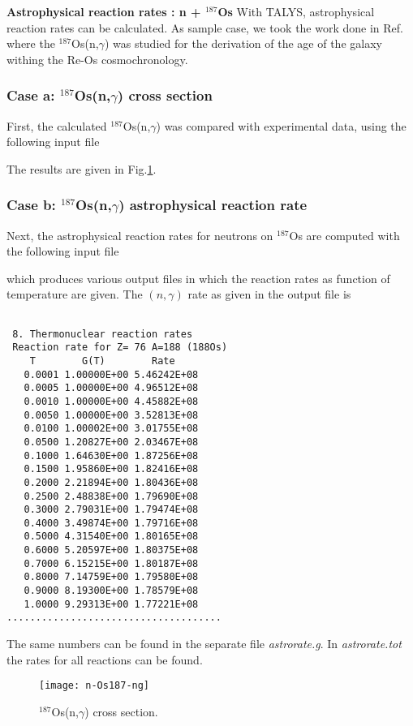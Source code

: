 \begin{samplecase}
{\bf Astrophysical reaction rates : n + ${}^{187}$Os}\newline
With TALYS, astrophysical reaction rates can be calculated.
As sample case, we took the work done in
Ref.\cite{Segawa2007} where the ${}^{187}$Os(n,$\gamma$) was studied for
the derivation of the age of the galaxy withing the
Re-Os cosmochronology. 
\subsubsection{Case a: ${}^{187}$Os(n,$\gamma$) cross section}
First, the calculated ${}^{187}$Os(n,$\gamma$) was compared with experimental data,
using the following input file


The results are given in Fig.\ref{os187ng}.
\subsubsection{Case b: ${}^{187}$Os(n,$\gamma$) astrophysical reaction rate}
Next, the astrophysical reaction rates for neutrons on ${}^{187}$Os are computed 
with the following input file


which produces various output files in which the reaction rates as 
function of temperature are given.
The $(n,\gamma )$ rate as given in the output file is   
{\small \begin{verbatim}

 8. Thermonuclear reaction rates                                                 
 Reaction rate for Z= 76 A=188 (188Os)                                           
    T        G(T)        Rate            
   0.0001 1.00000E+00 5.46242E+08                                                  
   0.0005 1.00000E+00 4.96512E+08
   0.0010 1.00000E+00 4.45882E+08                                                  
   0.0050 1.00000E+00 3.52813E+08
   0.0100 1.00002E+00 3.01755E+08                                                  
   0.0500 1.20827E+00 2.03467E+08
   0.1000 1.64630E+00 1.87256E+08                                                  
   0.1500 1.95860E+00 1.82416E+08
   0.2000 2.21894E+00 1.80436E+08                                                  
   0.2500 2.48838E+00 1.79690E+08
   0.3000 2.79031E+00 1.79474E+08                                                  
   0.4000 3.49874E+00 1.79716E+08
   0.5000 4.31540E+00 1.80165E+08
   0.6000 5.20597E+00 1.80375E+08
   0.7000 6.15215E+00 1.80187E+08
   0.8000 7.14759E+00 1.79580E+08
   0.9000 8.19300E+00 1.78579E+08
   1.0000 9.29313E+00 1.77221E+08
.....................................
\end{verbatim} } \renewcommand{\baselinestretch}{1.07}\small\normalsize
\noindent
The same numbers can be found in the separate file {\em astrorate.g}.
In {\em astrorate.tot} the rates for all reactions can be found.

\end{samplecase}
\begin{figure}
\centering\texttt{[image: n-Os187-ng]}
\caption{${}^{187}$Os(n,$\gamma$) cross section.}
\label{os187ng}
\end{figure}
